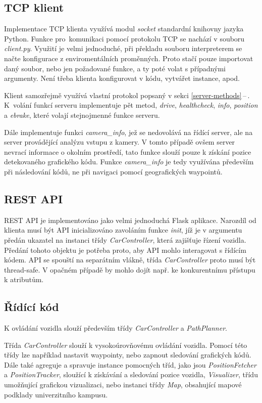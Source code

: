 \documentclass[czech, bachelor]{diploma}
\newcommand{\filipref}[1]{\ref{#1}\,--\,\nameref{#1}}
\begin{document}
\subsection{TCP klient}

Implementace TCP klienta využívá modul \emph{socket} standardní knihovny jazyka Python. Funkce pro~komunikaci pomocí protokolu TCP
se nachází v souboru \emph{client.py}. Využití je velmi jednoduché, při překladu souboru interpreterem se načte konfigurace
z enviromentálních proměnných. Proto stačí pouze importovat daný soubor, nebo jen požadované funkce, a ty poté volat s případnými
argumenty. Není třeba klienta konfigurovat v kódu, vytvářet instance, apod.

Klient samozřejmě využívá vlastní protokol popsaný v sekci \filipref{server-methods}. K~volání funkcí serveru implementuje pět
metod, \emph{drive}, \emph{healthcheck}, \emph{info}, \emph{position} a \emph{ebrake}, které volají stejnojmenné funkce serveru.

Dále implementuje funkci \emph{camera\_info}, jež se nedovolává na řídící server, ale na server provádějící analýzu vstupu
z kamery. V tomto případě ovšem server nevrací informace o okolním prostředí, tato funkce slouží pouze k získání pozice
detekovaného grafického kódu. Funkce \emph{camera\_info} je tedy využívána především při následování kódů, ne při navigaci pomocí
geografických waypointů.

\subsection{REST API}

REST API je implementováno jako velmi jednoduchá Flask aplikace. Narozdíl od klienta musí být API inicializováno zavoláním funkce
\emph{init}, jíž je v argumentu předán ukazatel na instanci třídy \emph{CarController}, která zajišťuje řízení vozidla. Předání
tohoto objektu je potřeba proto, aby API mohlo interagovat s řídícím kódem. API se spouští na separátním vlákně, třída
\emph{CarController} proto musí být thread-safe. V opačném případě by mohlo dojít např. ke konkurentnímu přístupu k atributům.

\subsection{Řídící kód}

K ovládání vozidla slouží především třídy \emph{CarController} a \emph{PathPlanner}.

Třída \emph{CarController} slouží k vysokoúrovňovému ovládání vozidla. Pomocí této třídy lze například nastavit waypointy, nebo
zapnout sledování grafických kódů. Dále také agreguje a spravuje instance pomocných tříd, jako jsou \emph{PositionFetcher}
a \emph{PositionTracker}, sloužící k získávání a sledování pozice vozidla, \emph{Visualizer}, třídu umožňující grafickou
vizualizaci, nebo instanci třídy \emph{Map}, obsahující mapové podklady univerzitního kampusu.
\end{document}
